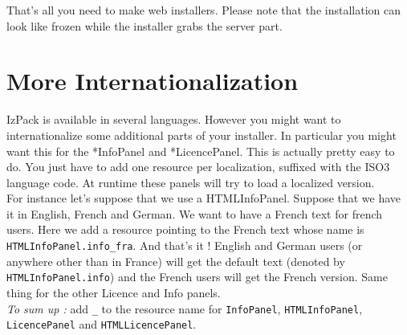 That's all you need to make web installers.
Please note that the installation can look like frozen while the installer
grabs the server part.\\

\section{More Internationalization}

IzPack is available in several languages. However you might want to
internationalize some additional parts of your installer. In particular you
might want this for the *InfoPanel and *LicencePanel. This is actually pretty
easy to do. You just have to add one resource per localization, suffixed with the
ISO3 language code. At runtime these panels will try to load a localized version.\\

For instance let's suppose that we use a HTMLInfoPanel. Suppose that we have it
in English, French and German. We want to have a French text for french users.
Here we add a resource pointing to the French text whose name is
\texttt{HTMLInfoPanel.info\_fra}. And that's it ! English and German users (or
anywhere other than in France) will get the default text (denoted by 
\texttt{HTMLInfoPanel.info}) and the French users will get the French version.
Same thing for the other Licence and Info panels.\\

\noindent
\textit{To sum up :} add \texttt{\_<iso3 code>} to the resource name for
\texttt{InfoPanel}, \texttt{HTMLInfoPanel}, \texttt{LicencePanel} and
\texttt{HTMLLicencePanel}.\\
